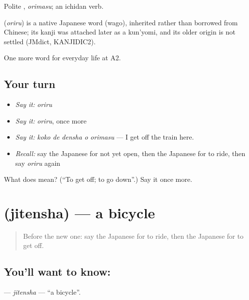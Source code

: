 Polite \textbf{}, \emph{orimasu}; an ichidan verb.

\begin{cousinweb}
\textbf{} (\emph{oriru}) is a native Japanese word (wago), inherited rather than borrowed from Chinese; its kanji was attached later as a kun'yomi, and its older origin is not settled (JMdict, KANJIDIC2).
\end{cousinweb}

\begin{grammarlens}[title={What you've built}]
One more word for everyday life at A2.
\end{grammarlens}

\subsection*{Your turn}
\begin{itemize}
\raggedright
  \item \emph{Say it:} \emph{oriru}
  \item \emph{Say it:} \emph{oriru}, once more
  \item \emph{Say it:} \emph{koko de densha o orimasu} — I get off the train here.
  \item \emph{Recall:} say the Japanese for not yet open, then the Japanese for to ride, then say \emph{oriru} again
\end{itemize}

\begin{tcolorbox}[breakable,colback=teal!4,colframe=teal!35!black,title={Before you move on}]
What does  mean? (\textquotedblleft{}To get off; to go down\textquotedblright{}.) Say it once more.
\end{tcolorbox}
\section[\texorpdfstring{\ja{じてんしゃ} (jitensha)}{じてんしゃ (jitensha)}]{ (jitensha) — a bicycle}

\label{lesson:JA-C198-jitensha}



\begin{quote}
Before the new one: say the Japanese for to ride, then the Japanese for to get off.
\end{quote}

\subsection*{You'll want to know: }
\textbf{} — \emph{jitensha} — \textquotedblleft{}a bicycle\textquotedblright{}.


